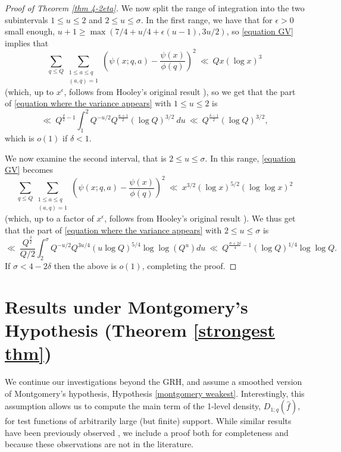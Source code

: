 \documentclass[12pt,reqno]{amsart}
\numberwithin{equation}{section}
\theoremstyle{plain}
\begin{document}
\begin{proof}[Proof of Theorem \ref{thm 4-2eta}]
We now split the range of integration into the two subintervals $1\leq u \leq 2$ and $2\leq u\leq \sigma$. In the first range, we have that for $\epsilon>0$ small enough, $u+1\geq \max(7/4+u/4+\epsilon(u-1),3u/2)$, so \eqref{equation GV} implies that
\begin{equation}\sum_{q\leq Q} \sum_{\substack{1\leq a\leq q \\ (a,q)=1}}\left(\psi(x;q,a)-\frac{\psi(x)}{\phi(q)} \right)^2\ \ll\ Qx(\log x)^{3}
\label{bound for Q>x^1/2}
\end{equation}
(which, up to $x^{\epsilon}$, follows from Hooley's original result \cite{hooley}),
so we get that the part of \eqref{equation where the variance appears} with $1\leq u\leq 2$ is
\begin{equation} \ll\ Q^{\frac{\delta}2-1} \int_1^{2} Q^{-u/2} Q^{\frac{u+1}{2}} (\log Q)^{3/2}\ du\ \ll\ Q^{\frac{\delta-1}2} (\log Q)^{3/2},\end{equation} which is $o(1)$ if $\delta < 1$.

We now examine the second interval, that is $2\leq u\leq \sigma$. In this range, \eqref{equation GV} becomes
\begin{equation}\sum_{q\leq Q} \sum_{\substack{1\leq a\leq q \\ (a,q)=1}}\left(\psi(x;q,a)-\frac{\psi(x)}{\phi(q)} \right)^2\ \ll\ x^{3/2} (\log x)^{5/2}(\log\log x)^2
\label{bound for Q<x^1/2}
\end{equation}
(which, up to a factor of $x^{\epsilon}$, follows from Hooley's original result \cite{hooley}).
We thus get that the part of \eqref{equation where the variance appears} with $2\leq u\leq \sigma$ is
\begin{equation} \ll\ \frac{Q^{\frac{\delta}2}}{Q/2} \int_2^{\sigma} Q^{-u/2} Q^{3u/4} (u\log Q)^{5/4} \log\log (Q^u) du\ \ll\ Q^{\frac{\sigma+2\delta}{4}-1} (\log Q)^{1/4} \log\log Q.\end{equation}
If $\sigma<4-2\delta$ then the above is $o(1)$, completing the proof.
\end{proof}

\section{Results under Montgomery's Hypothesis (Theorem \ref{strongest thm})}\label{sec:montstrong}

We continue our investigations beyond the GRH, and assume a smoothed version of Montgomery's hypothesis, Hypothesis \ref{montgomery weakest}. Interestingly, this assumption allows us to compute the main term of the 1-level density, $D_{1;q}(\widehat{f})$, for test functions of arbitrarily large (but finite) support. While similar results have been previously observed \cite{MilSar}, we include a proof both for completeness and because these observations are not in the literature.
\end{document}
